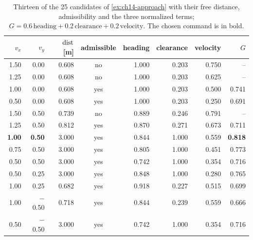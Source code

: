 \begin{table}[tb]
  \centering\small
  \caption{Thirteen of the 25 candidates of \cref{ex:ch14-approach} with
  their free distance, admissibility and the three normalized terms;
  $G = 0.6\,\mathrm{heading} + 0.2\,\mathrm{clearance} + 0.2\,\mathrm{velocity}$.
  The chosen command is in bold.}
  \label{tab:ch14-candidates}
  \begin{tabular}{@{}rrrcrrrr@{}}
  \toprule
  $v_x$ & $v_y$ & $\operatorname{dist}$ [m] & admissible & heading & clearance & velocity & $G$\\
  \midrule
  1.50 & 0.00 & 0.608 & no & 1.000 & 0.203 & 0.750 & --\\
  1.25 & 0.00 & 0.608 & no & 1.000 & 0.203 & 0.625 & --\\
  1.00 & 0.00 & 0.608 & yes & 1.000 & 0.203 & 0.500 & 0.741\\
  0.50 & 0.00 & 0.608 & yes & 1.000 & 0.203 & 0.250 & 0.691\\
  1.50 & 0.50 & 0.739 & no & 0.889 & 0.246 & 0.791 & --\\
  1.25 & 0.50 & 0.812 & yes & 0.870 & 0.271 & 0.673 & 0.711\\
  \textbf{1.00} & \textbf{0.50} & 3.000 & yes & 0.844 & 1.000 & 0.559 & \textbf{0.818}\\
  0.75 & 0.50 & 3.000 & yes & 0.805 & 1.000 & 0.451 & 0.773\\
  0.50 & 0.50 & 3.000 & yes & 0.742 & 1.000 & 0.354 & 0.716\\
  0.50 & 0.25 & 3.000 & yes & 0.848 & 1.000 & 0.280 & 0.765\\
  1.00 & 0.25 & 0.682 & yes & 0.918 & 0.227 & 0.515 & 0.699\\
  1.00 & $-$0.50 & 0.718 & yes & 0.844 & 0.239 & 0.559 & 0.666\\
  0.50 & $-$0.50 & 3.000 & yes & 0.742 & 1.000 & 0.354 & 0.716\\
  \bottomrule
  \end{tabular}
\end{table}

